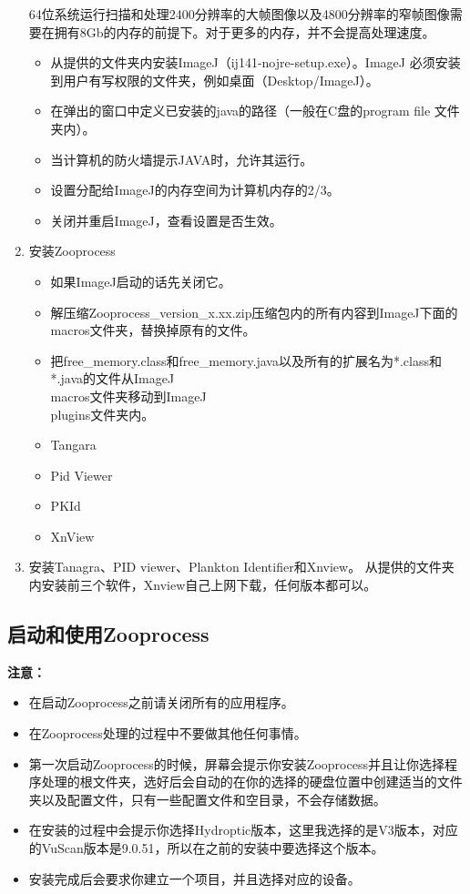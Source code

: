 \begin{enumerate}
				64位系统运行扫描和处理2400分辨率的大帧图像以及4800分辨率的窄帧图像需要在拥有8Gb的内存的前提下。对于更多的内存，并不会提高处理速度。
				\begin{itemize}
					\item 从提供的文件夹内安装ImageJ（ij141-nojre-setup.exe）。ImageJ 必须安装到用户有写权限的文件夹，例如桌面（Desktop/ImageJ）。
					\item 在弹出的窗口中定义已安装的java的路径（一般在C盘的program file 文件夹内）。
					\item 当计算机的防火墙提示JAVA时，允许其运行。
					\item 设置分配给ImageJ的内存空间为计算机内存的2/3。
					\item	关闭并重启ImageJ，查看设置是否生效。
				\end{itemize}
			\item 安装Zooprocess
				\begin{itemize}
					\item 如果ImageJ启动的话先关闭它。
					\item 解压缩Zooprocess\_version\_x.xx.zip压缩包内的所有内容到ImageJ下面的macros文件夹，替换掉原有的文件。
					\item 把free\_memory.class和free\_memory.java以及所有的扩展名为*.class和*.java的文件从ImageJ\\macros文件夹移动到ImageJ\\plugins文件夹内。
					\item Tangara
					\item	Pid Viewer
					\item PKId
					\item XnView
				\end{itemize}
			\item 安装Tanagra、PID viewer、Plankton Identifier和Xnview。
				从提供的文件夹内安装前三个软件，Xnview自己上网下载，任何版本都可以。
		\end{enumerate}
		
\subsection{启动和使用Zooprocess}

	\textbf{注意：}
	\begin{itemize}
		\item 在启动Zooprocess之前请关闭所有的应用程序。
		\item 在Zooprocess处理的过程中不要做其他任何事情。
		\item 第一次启动Zooprocess的时候，屏幕会提示你安装Zooprocess并且让你选择程序处理的根文件夹，选好后会自动的在你的选择的硬盘位置中创建适当的文件夹以及配置文件，只有一些配置文件和空目录，不会存储数据。
		\item 在安装的过程中会提示你选择Hydroptic版本，这里我选择的是V3版本，对应的VuScan版本是9.0.51，所以在之前的安装中要选择这个版本。
		\item	安装完成后会要求你建立一个项目，并且选择对应的设备。
	\end{itemize}
	

